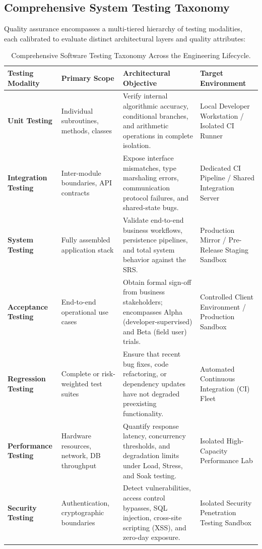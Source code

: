 \documentclass[11pt,a4paper]{article}
\begin{document}
\subsection{Comprehensive System Testing Taxonomy}
Quality assurance encompasses a multi-tiered hierarchy of testing modalities, each calibrated to evaluate distinct architectural layers and quality attributes:

\begin{table}[htbp]
\centering
\small
\renewcommand{\arraystretch}{1.25}
\begin{tabularx}{\textwidth}{L{2.5cm} L{3.2cm} Y L{3.2cm}}
\toprule
{}
\textbf{Testing Modality} & \textbf{Primary Scope} & \textbf{Architectural Objective} & \textbf{Target Environment} \\
\midrule
\textbf{Unit Testing} & Individual subroutines, methods, classes & Verify internal algorithmic accuracy, conditional branches, and arithmetic operations in complete isolation. & Local Developer Workstation / Isolated CI Runner \\
\textbf{Integration Testing} & Inter-module boundaries, API contracts & Expose interface mismatches, type marshaling errors, communication protocol failures, and shared-state bugs. & Dedicated CI Pipeline / Shared Integration Server \\
\textbf{System Testing} & Fully assembled application stack & Validate end-to-end business workflows, persistence pipelines, and total system behavior against the SRS. & Production Mirror / Pre-Release Staging Sandbox \\
\textbf{Acceptance Testing} & End-to-end operational use cases & Obtain formal sign-off from business stakeholders; encompasses Alpha (developer-supervised) and Beta (field user) trials. & Controlled Client Environment / Production Sandbox \\
\textbf{Regression Testing} & Complete or risk-weighted test suites & Ensure that recent bug fixes, code refactoring, or dependency updates have not degraded preexisting functionality. & Automated Continuous Integration (CI) Fleet \\
\textbf{Performance Testing} & Hardware resources, network, DB throughput & Quantify response latency, concurrency thresholds, and degradation limits under Load, Stress, and Soak testing. & Isolated High-Capacity Performance Lab \\
\textbf{Security Testing} & Authentication, cryptographic boundaries & Detect vulnerabilities, access control bypasses, SQL injection, cross-site scripting (XSS), and zero-day exposure. & Isolated Security Penetration Testing Sandbox \\
\bottomrule
\end{tabularx}
\caption{Comprehensive Software Testing Taxonomy Across the Engineering Lifecycle.}
\label{tab:testing_taxonomy}
\end{table}
\end{document}
